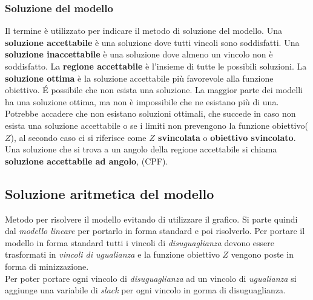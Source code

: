 \documentclass{article}
\begin{document}
\subsubsection{Soluzione del modello}
Il termine è utilizzato per indicare il metodo di soluzione del modello. Una \textbf{soluzione accettabile} è una soluzione dove tutti vincoli sono soddisfatti. Una \textbf{soluzione inaccettabile} è una soluzione dove almeno un vincolo non è soddisfatto. La \textbf{regione accettabile} è l'insieme di tutte le possibili soluzioni. La \textbf{soluzione ottima} è la soluzione accettabile più favorevole alla funzione obiettivo. É possibile che non esista una soluzione. La maggior parte dei modelli ha una soluzione ottima, ma non è impossibile che ne esistano più di una. Potrebbe accadere che non esistano soluzioni ottimali, che succede in caso non esista una soluzione accettabile o se i limiti non prevengono la funzione obiettivo($Z$), al secondo caso ci si riferisce come \textbf{$Z$ svincolata} o \textbf{obiettivo svincolato}. Una soluzione che si trova a un angolo della regione accettabile si chiama \textbf{soluzione accettabile ad angolo}, (CPF).


\subsection{Soluzione aritmetica del modello}
Metodo per risolvere il modello evitando di utilizzare il grafico. Si parte quindi dal \textit{modello lineare} per portarlo in forma standard e poi risolverlo. Per portare il modello in forma standard tutti i vincoli di \textit{disuguaglianza} devono essere trasformati in \textit{vincoli di ugualianza} e la funzione obiettivo $Z$ vengono poste in forma di minizzazione. \\ Per poter portare ogni vincolo di \textit{disuguaglianza} ad un vincolo di \textit{ugualianza} si aggiunge una variabile di \textit{slack} per ogni vincolo in gorma di disuguaglianza.
\end{document}
